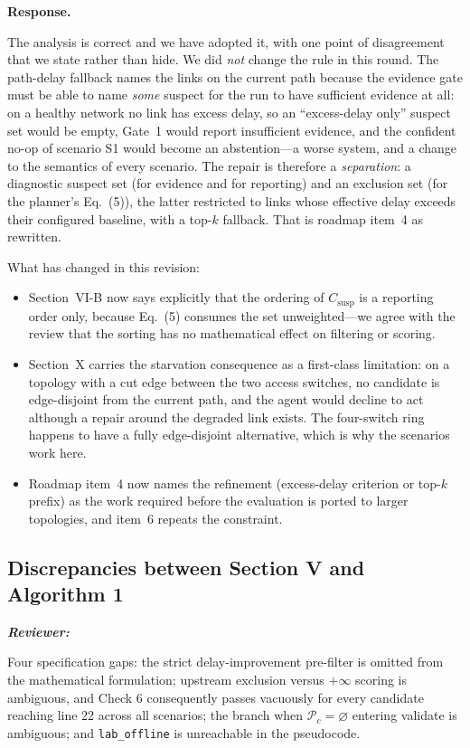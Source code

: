 \documentclass[11pt,a4paper]{article}
\newenvironment{reviewer}{\par\medskip\noindent\begin{minipage}{\linewidth}\small\itshape\color{quote}\textbf{Reviewer:}\par}{\end{minipage}\medskip\par}
\newenvironment{response}{\par\noindent\begin{minipage}{\linewidth}\small\textbf{Response.}\par}{\end{minipage}\medskip\par}
\begin{document}
\begin{response}
The analysis is correct and we have adopted it, with one point of
disagreement that we state rather than hide. We did \emph{not} change the
rule in this round. The path-delay fallback names the links on the
current path because the evidence gate must be able to name \emph{some}
suspect for the run to have sufficient evidence at all: on a healthy
network no link has excess delay, so an ``excess-delay only'' suspect set
would be empty, Gate~1 would report insufficient evidence, and the
confident no-op of scenario S1 would become an abstention---a worse
system, and a change to the semantics of every scenario. The repair is
therefore a \emph{separation}: a diagnostic suspect set (for evidence and
for reporting) and an exclusion set (for the planner's Eq.~(5)), the
latter restricted to links whose effective delay exceeds their configured
baseline, with a top-$k$ fallback. That is roadmap item~4 as rewritten.

What has changed in this revision:

\begin{itemize}
  \item Section~VI-B now says explicitly that the ordering of
    $C_{\mathrm{susp}}$ is a reporting order only, because Eq.~(5)
    consumes the set unweighted---we agree with the review that the
    sorting has no mathematical effect on filtering or scoring.
  \item Section~X carries the starvation consequence as a first-class
    limitation: on a topology with a cut edge between the two access
    switches, no candidate is edge-disjoint from the current path, and the
    agent would decline to act although a repair around the degraded link
    exists. The four-switch ring happens to have a fully edge-disjoint
    alternative, which is why the scenarios work here.
  \item Roadmap item~4 now names the refinement (excess-delay criterion or
    top-$k$ prefix) as the work required before the evaluation is ported
    to larger topologies, and item~6 repeats the constraint.
\end{itemize}
\end{response}

\subsection{Discrepancies between Section V and Algorithm 1}

\begin{reviewer}
Four specification gaps: the strict delay-improvement pre-filter is
omitted from the mathematical formulation; upstream exclusion versus
$+\infty$ scoring is ambiguous, and Check 6 consequently passes vacuously
for every candidate reaching line 22 across all scenarios; the branch when
$\mathcal{P}_c=\varnothing$ entering validate is ambiguous; and
\texttt{lab\_offline} is unreachable in the pseudocode.
\end{reviewer}
\end{document}
